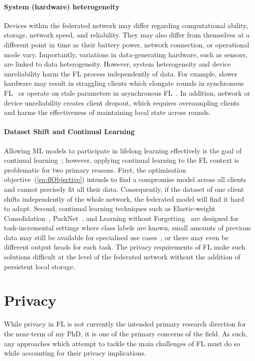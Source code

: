 \paragraph{System (hardware) heterogeneity} Devices within the federated network may differ regarding computational ability, storage, network speed, and reliability. They may also differ from themselves at a different point in time as their battery power, network connection, or operational mode vary. Importantly, variations in data-generating hardware, such as sensors, are linked to data heterogeneity. However, system heterogeneity and device unreliability harm the FL process independently of data. For example, slower hardware may result in straggling clients which elongate rounds in synchronous FL~\citep{ScaleSystemDesign,FedProx} or operate on stale parameters in asynchronous FL~\citep{AsyncFedOpt,PAPAYA}\@. In addition, network or device unreliability creates client dropout, which requires oversampling clients~\cite{ScaleSystemDesign} and harms the effectiveness of maintaining local state across rounds.

\paragraph{Dataset Shift and Continual Learning}  Allowing ML models to participate in lifelong learning effectively is the goal of continual learning~\citep{ContinualLearningSurvey}; however, applying continual learning to the FL context is problematic for two primary reasons. First, the optimisation objective~(\cref{eq:flObjective}) intends to find a compromise model across all clients and cannot precisely fit all their data. Consequently, if the dataset of one client shifts independently of the whole network, the federated model will find it hard to adapt. Second, continual learning techniques such as Elastic-weight Consolidation~\citep{EWC}, PackNet~\citep{PackNetAM}, and Learning without Forgetting~\citep{LearningWithoutForgetting} are designed for task-incremental settings where class labels are known, small amounts of previous data may still be available for specialised use cases~\citep{EWC}, or there may even be different output heads for each task. The privacy requirements of FL make such solutions difficult at the level of the federated network without the addition of persistent local storage.
\section{Privacy}
While privacy in FL is not currently the intended primary research direction for the near-term of my PhD, it is one of the primary concerns of the field. As such, any approaches which attempt to tackle the main challenges of FL must do so while accounting for their privacy implications.

